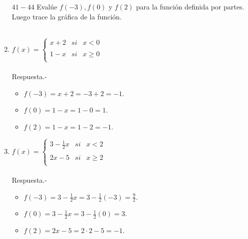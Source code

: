\begin{enumerate}
    $41-44$ Evalúe $f(-3), f(0)$ y $f(2)$ para la función definida por partes. Luego trace la gráfica de la función.\\\\

    \item $f(x)= \left\{ \begin{array}{lcr}
		     x+2 &   si  & x<0 \\
		     \\ 1-x &  si & x \geq 0 \\
		 \end{array} \right.$ \\\\

	Respuesta.-\; \\
	
	\begin{itemize}
	    \item $f(-3) = x+2 = -3+2 = -1$.
	    \item $f(0) = 1-x = 1-0 = 1$.
	    \item $f(2) = 1-x = 1 - 2 = -1$.
	\end{itemize}

	\begin{center}
	\end{center}
	\vspace{.5cm}

    \item $f(x)= \left\{ \begin{array}{lcr}
		    3 - \frac{1}{2}x &   si  & x<2 \\
		     \\ 2x - 5  &  si & x \geq 2 \\
		 \end{array} \right.$ \\\\
	
	Respuesta.-\; \\

	\begin{itemize}
	    \item $f(-3)=3 - \frac{1}{2}x = 3 - \frac{1}{2}(-3) = \frac{9}{2}$.
	    \item $f(0)= 3 - \frac{1}{2}x = 3 - \frac{1}{2}(0) = 3$.
	    \item $f(2)= 2x - 5 = 2\cdot 2 - 5 = -1$.
	\end{itemize}


\end{enumerate}
